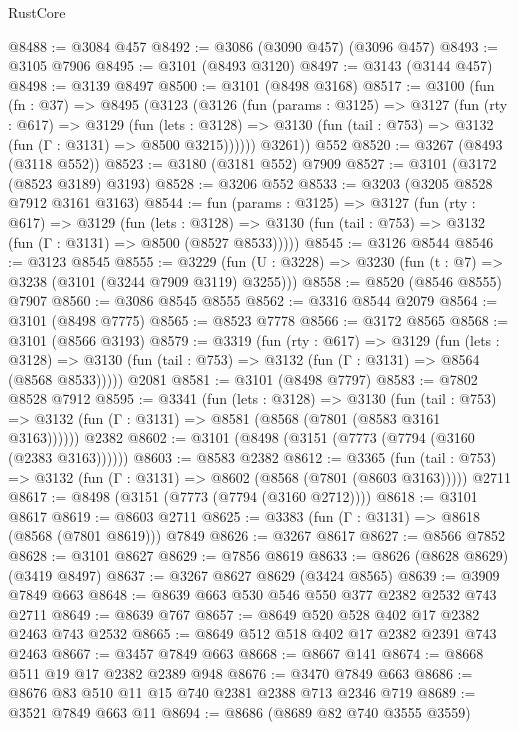 \begin{lexlean}{RustCore}
\begin{coremodule}
@8488 := @3084 @457
@8492 := @3086 (@3090 @457) (@3096 @457)
@8493 := @3105 @7906
@8495 := @3101 (@8493 @3120)
@8497 := @3143 (@3144 @457)
@8498 := @3139 @8497
@8500 := @3101 (@8498 @3168)
@8517 := @3100
    (fun (fn : @37) =>
    @8495
      (@3123
        (@3126
          (fun (params : @3125) =>
          @3127
            (fun (rty : @617) =>
            @3129
              (fun (lets : @3128) =>
              @3130 (fun (tail : @753) => @3132 (fun (Γ : @3131) => @8500 @3215))))))
        @3261))
    @552
@8520 := @3267 (@8493 (@3118 @552))
@8523 := @3180 (@3181 @552) @7909
@8527 := @3101 (@3172 (@8523 @3189) @3193)
@8528 := @3206 @552
@8533 := @3203 (@3205 @8528 @7912 @3161 @3163)
@8544 := fun (params : @3125) =>
  @3127
    (fun (rty : @617) =>
    @3129
      (fun (lets : @3128) =>
      @3130 (fun (tail : @753) => @3132 (fun (Γ : @3131) => @8500 (@8527 @8533)))))
@8545 := @3126 @8544
@8546 := @3123 @8545
@8555 := @3229 (fun (U : @3228) => @3230 (fun (t : @7) => @3238 (@3101 (@3244 @7909 @3119) @3255)))
@8558 := @8520 (@8546 @8555) @7907
@8560 := @3086 @8545 @8555
@8562 := @3316 @8544 @2079
@8564 := @3101 (@8498 @7775)
@8565 := @8523 @7778
@8566 := @3172 @8565
@8568 := @3101 (@8566 @3193)
@8579 := @3319
    (fun (rty : @617) =>
    @3129
      (fun (lets : @3128) =>
      @3130 (fun (tail : @753) => @3132 (fun (Γ : @3131) => @8564 (@8568 @8533)))))
    @2081
@8581 := @3101 (@8498 @7797)
@8583 := @7802 @8528 @7912
@8595 := @3341
    (fun (lets : @3128) =>
    @3130
      (fun (tail : @753) => @3132 (fun (Γ : @3131) => @8581 (@8568 (@7801 (@8583 @3161 @3163))))))
    @2382
@8602 := @3101 (@8498 (@3151 (@7773 (@7794 (@3160 (@2383 @3163))))))
@8603 := @8583 @2382
@8612 := @3365
    (fun (tail : @753) => @3132 (fun (Γ : @3131) => @8602 (@8568 (@7801 (@8603 @3163)))))
    @2711
@8617 := @8498 (@3151 (@7773 (@7794 (@3160 @2712))))
@8618 := @3101 @8617
@8619 := @8603 @2711
@8625 := @3383 (fun (Γ : @3131) => @8618 (@8568 (@7801 @8619))) @7849
@8626 := @3267 @8617
@8627 := @8566 @7852
@8628 := @3101 @8627
@8629 := @7856 @8619
@8633 := @8626 (@8628 @8629) (@3419 @8497)
@8637 := @3267 @8627 @8629 (@3424 @8565)
@8639 := @3909 @7849 @663
@8648 := @8639 @663 @530 @546 @550 @377 @2382 @2532 @743 @2711
@8649 := @8639 @767
@8657 := @8649 @520 @528 @402 @17 @2382 @2463 @743 @2532
@8665 := @8649 @512 @518 @402 @17 @2382 @2391 @743 @2463
@8667 := @3457 @7849 @663
@8668 := @8667 @141
@8674 := @8668 @511 @19 @17 @2382 @2389 @948
@8676 := @3470 @7849 @663
@8686 := @8676 @83 @510 @11 @15 @740 @2381 @2388 @713 @2346 @719
@8689 := @3521 @7849 @663 @11
@8694 := @8686 (@8689 @82 @740 @3555 @3559)

\end{coremodule}
\end{lexlean}
